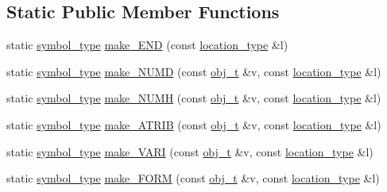 \subsection*{Static Public Member Functions}
\begin{DoxyCompactItemize}
\item 
static \hyperlink{classyy_1_1genesyspp__parser_a5b9a172d481d4a62555ee11a7957e789}{symbol\-\_\-type} \hyperlink{classyy_1_1genesyspp__parser_a8f9ec2ebb7b064e9d90beea68251ce77}{make\-\_\-\-E\-N\-D} (const \hyperlink{classyy_1_1genesyspp__parser_aa0276d3782ebff157827ad5e7d44f97c}{location\-\_\-type} \&l)
\item 
static \hyperlink{classyy_1_1genesyspp__parser_a5b9a172d481d4a62555ee11a7957e789}{symbol\-\_\-type} \hyperlink{classyy_1_1genesyspp__parser_a9c5a9950823e1b47289bb09c181aba62}{make\-\_\-\-N\-U\-M\-D} (const \hyperlink{classobj__t}{obj\-\_\-t} \&v, const \hyperlink{classyy_1_1genesyspp__parser_aa0276d3782ebff157827ad5e7d44f97c}{location\-\_\-type} \&l)
\item 
static \hyperlink{classyy_1_1genesyspp__parser_a5b9a172d481d4a62555ee11a7957e789}{symbol\-\_\-type} \hyperlink{classyy_1_1genesyspp__parser_a9cf290fdca1278917d918ce85a04254d}{make\-\_\-\-N\-U\-M\-H} (const \hyperlink{classobj__t}{obj\-\_\-t} \&v, const \hyperlink{classyy_1_1genesyspp__parser_aa0276d3782ebff157827ad5e7d44f97c}{location\-\_\-type} \&l)
\item 
static \hyperlink{classyy_1_1genesyspp__parser_a5b9a172d481d4a62555ee11a7957e789}{symbol\-\_\-type} \hyperlink{classyy_1_1genesyspp__parser_a29932293f709da03fce69d9a58128e4f}{make\-\_\-\-A\-T\-R\-I\-B} (const \hyperlink{classobj__t}{obj\-\_\-t} \&v, const \hyperlink{classyy_1_1genesyspp__parser_aa0276d3782ebff157827ad5e7d44f97c}{location\-\_\-type} \&l)
\item 
static \hyperlink{classyy_1_1genesyspp__parser_a5b9a172d481d4a62555ee11a7957e789}{symbol\-\_\-type} \hyperlink{classyy_1_1genesyspp__parser_a09b8d82b646eb65281935146e49d9a89}{make\-\_\-\-V\-A\-R\-I} (const \hyperlink{classobj__t}{obj\-\_\-t} \&v, const \hyperlink{classyy_1_1genesyspp__parser_aa0276d3782ebff157827ad5e7d44f97c}{location\-\_\-type} \&l)
\item 
static \hyperlink{classyy_1_1genesyspp__parser_a5b9a172d481d4a62555ee11a7957e789}{symbol\-\_\-type} \hyperlink{classyy_1_1genesyspp__parser_a0ef8d76f095e2cface4c3de08e22524d}{make\-\_\-\-F\-O\-R\-M} (const \hyperlink{classobj__t}{obj\-\_\-t} \&v, const \hyperlink{classyy_1_1genesyspp__parser_aa0276d3782ebff157827ad5e7d44f97c}{location\-\_\-type} \&l)

\end{DoxyCompactItemize}
